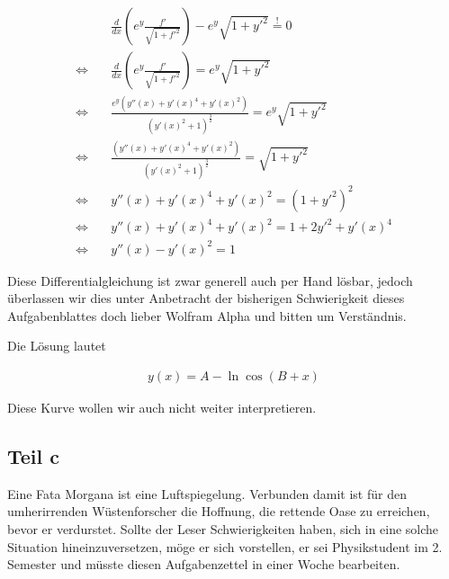 \documentclass[a4paper,german,12pt,smallheadings]{scrartcl}
\begin{document}
\begin{align*}
  &\frac{d}{dx} \left(e^y \frac{f'}{\sqrt{1+f'^2}} \right) - e^y \sqrt{1+y'^2} \overset{!}{=} 0 \\
  \Leftrightarrow \quad &\frac{d}{dx} \left(e^y \frac{f'}{\sqrt{1+f'^2}} \right) = e^y \sqrt{1+y'^2} \\
  \Leftrightarrow \quad &\frac{e^y \left(y''(x) + y'(x)^4 + y'(x)^2\right)}{(y'(x)^2 + 1)^\frac{3}{2}} = e^y \sqrt{1+y'^2} \\
  \Leftrightarrow \quad &\frac{\left(y''(x) + y'(x)^4 + y'(x)^2\right)}{(y'(x)^2 + 1)^\frac{3}{2}} = \sqrt{1+y'^2} \\
  \Leftrightarrow \quad &y''(x) + y'(x)^4 + y'(x)^2 = \left(1+y'^2\right)^2 \\
  \Leftrightarrow \quad &y''(x) + y'(x)^4 + y'(x)^2 = 1+2y'^2+y'(x)^4 \\
  \Leftrightarrow \quad &y''(x) - y'(x)^2 = 1
\end{align*}

Diese Differentialgleichung ist zwar generell auch per Hand lösbar, jedoch
überlassen wir dies unter Anbetracht der bisherigen Schwierigkeit dieses
Aufgabenblattes doch lieber Wolfram Alpha und bitten um Verständnis.

Die Lösung lautet

\begin{align*}
  y(x) = A - \ln \cos\left(B + x\right)
\end{align*}

Diese Kurve wollen wir auch nicht weiter interpretieren.

\subsection*{Teil c}
Eine Fata Morgana ist eine Luftspiegelung. Verbunden damit ist für den
umherirrenden Wüstenforscher die Hoffnung, die rettende Oase zu erreichen,
bevor er verdurstet. Sollte der Leser Schwierigkeiten haben, sich in eine
solche Situation hineinzuversetzen, möge er sich vorstellen, er sei
Physikstudent im 2. Semester und müsste diesen Aufgabenzettel in einer Woche
bearbeiten.
\end{document}
